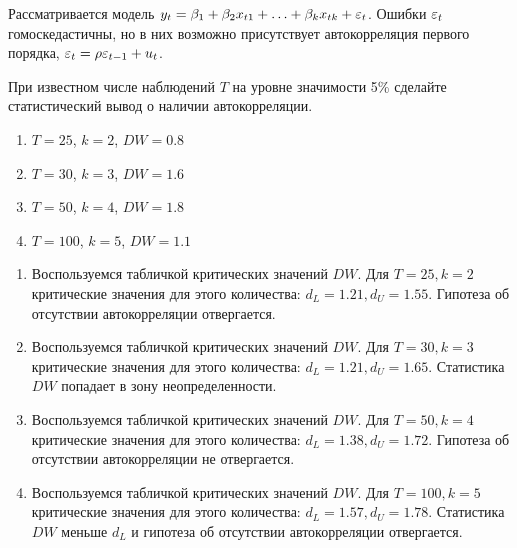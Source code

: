 \begin{problem}
Рассматривается модель $y_t=\beta_1+\beta_2 x_{t1}+\ldots+\beta_k x_{tk}+\varepsilon_t$. Ошибки $\varepsilon_t$ гомоскедастичны, но в них возможно присутствует автокорреляция первого порядка, $\varepsilon_t=\rho \varepsilon_{t-1}+u_t$. 

При известном числе наблюдений $T$ на уровне значимости 5\% сделайте статистический вывод о наличии автокорреляции.
\begin{enumerate}
\item $T=25$, $k=2$, $DW=0.8$
\item $T=30$, $k=3$, $DW=1.6$
\item $T=50$, $k=4$, $DW=1.8$
\item $T=100$, $k=5$, $DW=1.1$
\end{enumerate}


\begin{sol}
\begin{enumerate}
  \item Воспользуемся табличкой критических значений $DW$. 
  Для $T = 25, k = 2$ критические значения для этого количества: $d_L = 1.21, d_U = 1.55$. 
  Гипотеза об отсутствии автокорреляции отвергается.
  \item Воспользуемся табличкой критических значений $DW$. 
  Для $T = 30, k = 3$ критические значения для этого количества: $d_L = 1.21, d_U = 1.65$. 
  Статистика $DW$ попадает в зону неопределенности. 
  \item Воспользуемся табличкой критических значений $DW$. 
  Для $T = 50, k = 4$ критические значения для этого количества: $d_L = 1.38, d_U = 1.72$. 
  Гипотеза об отсутствии автокорреляции не отвергается.
 \item  Воспользуемся табличкой критических значений $DW$. 
  Для $T = 100, k = 5$ критические значения для этого количества: $d_L = 1.57, d_U = 1.78$. 
  Статистика $DW$ меньше  $d_L$ и гипотеза об отсутствии автокорреляции отвергается.
\end{enumerate}
\end{sol}
\end{problem}



